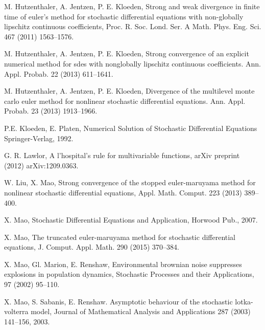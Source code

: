 \begin{thebibliography}{26}
M. Hutzenthaler, A. Jentzen,  P. E. Kloeden,
\newblock Strong and weak divergence in finite time of euler's method for
  stochastic differential equations with non-globally lipschitz continuous
  coefficients,
\newblock Proc. R. Soc. Lond. Ser. A Math. Phys. Eng. Sci. 467 (2011) 1563--1576.


M. Hutzenthaler, A. Jentzen,  P. E. Kloeden,
\newblock Strong convergence of an explicit numerical method for sdes with
  nonglobally lipschitz continuous coefficients.
\newblock Ann. Appl. Probab. 22 (2013) 611--1641.


M. Hutzenthaler, A. Jentzen,  P. E. Kloeden,
\newblock Divergence of the multilevel monte carlo euler method for nonlinear
  stochastic differential equations.
\newblock Ann. Appl. Probab. 23 (2013)  1913--1966.

P.E. Kloeden, E. Platen,
\newblock Numerical Solution of Stochastic Differential Equations
\newblock Springer-Verlag, 1992. 


G. R. Lawlor,
\newblock A l'hospital's rule for multivariable functions,
\newblock arXiv preprint (2012) arXiv:1209.0363.

W. Liu, X. Mao,
\newblock Strong convergence of the stopped euler-maruyama method for nonlinear
  stochastic differential equations,
\newblock Appl. Math. Comput. 223 (2013) 389--400.

X. Mao,
\newblock Stochastic Differential Equations and Application,
\newblock Horwood Pub., 2007.

X. Mao,
\newblock The truncated euler-maruyama method for stochastic differential
  equations,
\newblock J. Comput. Appl. Math. 290 (2015) 370--384.

X. Mao, Gl. Marion,  E. Renshaw,
\newblock Environmental brownian noise suppresses explosions in population
  dynamics,
\newblock Stochastic Processes and their Applications, 97 (2002) 95--110.

X. Mao, S. Sabanis, E. Renshaw.
\newblock Asymptotic behaviour of the stochastic lotka-volterra model,
\newblock Journal of Mathematical Analysis and Applications
  287 (2003) 141--156, 2003.



\end{thebibliography}
